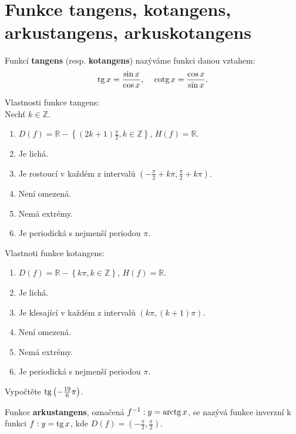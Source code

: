 \section{Funkce tangens, kotangens, arkustangens, arkuskotangens}
\begin{definition}
  Funkcí \textbf{tangens} (resp. \textbf{kotangens}) nazýváme funkci danou vztahem:
  \begin{align*}
    \tg x = \frac{\sin x}{\cos x}, & & \cotg x = \frac{\cos x}{\sin x}.
  \end{align*}
\end{definition}

\begin{veta}
    Vlastnosti funkce tangens:\\
    Nechť $k\in \mathbb Z.$
    \begin{enumerate}[$i.$]
        \item $D(f)= \mathbb R-\left \{ (2k+1)\frac{\pi}{2}, k\in \mathbb Z \right \} $, $H(f)= \mathbb R $.
       	\item Je lichá.
        \item Je rostoucí v každém z intervalů $\left ( -\frac{\pi}{2}+k\pi, \frac{\pi}{2}+k\pi \right ) $.
        \item Není omezená.
        \item Nemá extrémy.
        \item Je periodická s nejmenší periodou $\pi.$
    \end{enumerate}
    Vlastnoti funkce kotangens:
    \begin{enumerate}[$i.$]
        \item $D(f)= \mathbb R-\left \{ k\pi, k\in \mathbb Z \right \} $, $H(f)= \mathbb R $.
       	\item Je lichá.
        \item Je klesající v každém z intervalů $\left ( k\pi, (k+1)\pi \right ) $.
        \item Není omezená.
        \item Nemá extrémy.
        \item Je periodická s nejmenší periodou $\pi.$
    \end{enumerate}
\end{veta}

\begin{priklad}
Vypočtěte $\operatorname{tg} \left ( -\frac{19}{6}\pi \right ) $.
\end{priklad}

\begin{definition}[Arkustangens]
  Funkce \textbf{arkustangens}, označená $f^{-1}: y=\operatorname{arctg} x$, se nazývá funkce inverzní k funkci $f: y=\operatorname{tg} x$, kde $D(f)=\left ( -\frac{\pi}{2}, \frac{\pi}{2} \right )$.
\end{definition}

